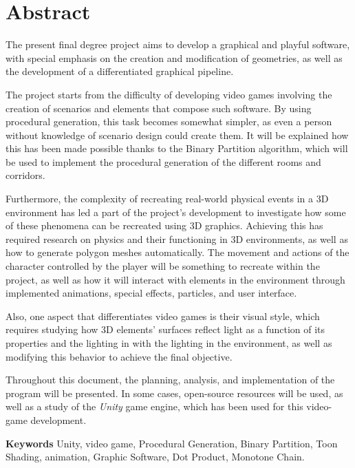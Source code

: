 \chapter{Abstract}

The present final degree project aims to develop a graphical and playful software, with special emphasis on the creation and modification of geometries, as well as the development of a differentiated graphical pipeline.

The project starts from the difficulty of developing video games involving the creation of scenarios and elements that compose such software. By using procedural generation, this task becomes somewhat simpler, as even a person without knowledge of scenario design could create them. It will be explained how this has been made possible thanks to the Binary Partition algorithm, which will be used to implement the procedural generation of the different rooms and corridors.

Furthermore, the complexity of recreating real-world physical events in a 3D environment has led a part of the project's development to investigate how some of these phenomena can be recreated using 3D graphics. Achieving this has required research on physics and their functioning in 3D environments, as well as how to generate polygon meshes automatically. The movement and actions of the character controlled by the player will be something to recreate within the project, as well as how it will interact with elements in the environment through implemented animations, special effects, particles, and user interface.

Also, one aspect that differentiates video games is their visual style, which requires studying how 3D elements' surfaces reflect light as a function of its properties and the lighting in with the lighting in the environment, as well as modifying this behavior to achieve the final objective.

Throughout this document, the planning, analysis, and implementation of the program will be presented. In some cases, open-source resources will be used, as well as a study of the \textit{Unity} game engine, which has been used for this video-game development.

\textbf{Keywords} Unity, video game, Procedural Generation, Binary Partition, Toon Shading, animation, Graphic Software, Dot Product, Monotone Chain.